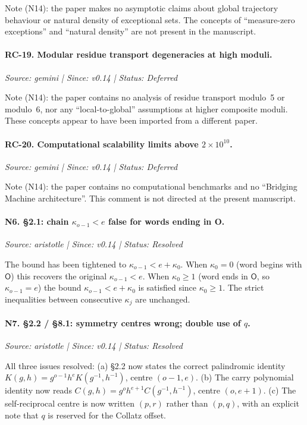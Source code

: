\documentclass[12pt]{article}
\theoremstyle{definition}
\theoremstyle{remark}
\theoremstyle{plain}
\newcommand{\OO}{\mathsf{O}}
\begin{document}
Note (N14): the paper makes no asymptotic claims about global trajectory
behaviour or natural density of exceptional sets.  The concepts of
``measure-zero exceptions'' and ``natural density'' are not present in the
manuscript.

\paragraph{RC-19. Modular residue transport degeneracies at high moduli.}
\textit{Source: gemini | Since: v0.14 | Status: Deferred}

Note (N14): the paper contains no analysis of residue transport modulo~5
or modulo~6, nor any ``local-to-global'' assumptions at higher composite moduli.
These concepts appear to have been imported from a different paper.

\paragraph{RC-20. Computational scalability limits above $2\times10^{10}$.}
\textit{Source: gemini | Since: v0.14 | Status: Deferred}

Note (N14): the paper contains no computational benchmarks and no
``Bridging Machine architecture''.  This comment is not directed at the
present manuscript.

\paragraph{N6. \S2.1: chain $\kappa_{o-1} < e$ false for words ending in O.}
\textit{Source: aristotle | Since: v0.14 | Status: Resolved}

The bound has been tightened to $\kappa_{o-1} < e + \kappa_0$.
When $\kappa_0 = 0$ (word begins with $\OO$) this recovers the original
$\kappa_{o-1} < e$.  When $\kappa_0 \ge 1$ (word ends in $\OO$, so
$\kappa_{o-1} = e$) the bound $\kappa_{o-1} < e + \kappa_0$ is satisfied since
$\kappa_0 \ge 1$.  The strict inequalities between consecutive $\kappa_j$ are
unchanged.

\paragraph{N7. \S2.2 / \S8.1: symmetry centres wrong; double use of $q$.}
\textit{Source: aristotle | Since: v0.14 | Status: Resolved}

All three issues resolved:
(a) \S2.2 now states the correct palindromic identity
$K(g,h) = g^{o-1} h^e K(g^{-1},h^{-1})$, centre $(o-1,e)$.
(b) The carry polynomial identity now reads
$C(g,h) = g^o h^{e+1} C(g^{-1},h^{-1})$, centre $(o,e+1)$.
(c) The self-reciprocal centre is now written $(p,r)$ rather than $(p,q)$,
with an explicit note that $q$ is reserved for the Collatz offset.
\end{document}

